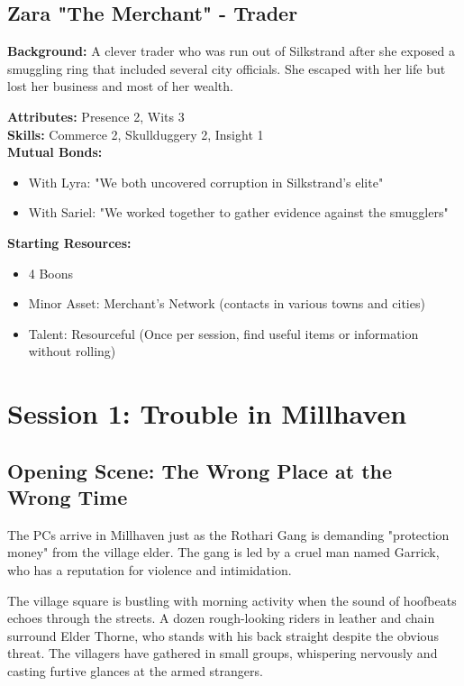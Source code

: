 \documentclass[11pt]{article}
\newenvironment{characterbox}[1]{%
  \begin{mdframed}[backgroundcolor=shadecolor, linewidth=1pt, linecolor=headercolor]%
  \subsection*{#1}%
}{%
  \end{mdframed}%
}
\begin{document}
\begin{characterbox}{Zara "The Merchant" - Trader}
\textbf{Background:} A clever trader who was run out of Silkstrand after she exposed a smuggling ring that included several city officials. She escaped with her life but lost her business and most of her wealth.

\textbf{Attributes:} Presence 2, Wits 3 \\
\textbf{Skills:} Commerce 2, Skullduggery 2, Insight 1 \\
\textbf{Mutual Bonds:}
\begin{itemize}
\item With Lyra: "We both uncovered corruption in Silkstrand's elite"
\item With Sariel: "We worked together to gather evidence against the smugglers"
\end{itemize}

\textbf{Starting Resources:}
\begin{itemize}
\item 4 Boons
\item Minor Asset: Merchant's Network (contacts in various towns and cities)
\item Talent: Resourceful (Once per session, find useful items or information without rolling)
\end{itemize}
\end{characterbox}

\section{Session 1: Trouble in Millhaven}

\subsection{Opening Scene: The Wrong Place at the Wrong Time}

The PCs arrive in Millhaven just as the Rothari Gang is demanding "protection money" from the village elder. The gang is led by a cruel man named Garrick, who has a reputation for violence and intimidation.

The village square is bustling with morning activity when the sound of hoofbeats echoes through the streets. A dozen rough-looking riders in leather and chain surround Elder Thorne, who stands with his back straight despite the obvious threat. The villagers have gathered in small groups, whispering nervously and casting furtive glances at the armed strangers.
\end{document}
